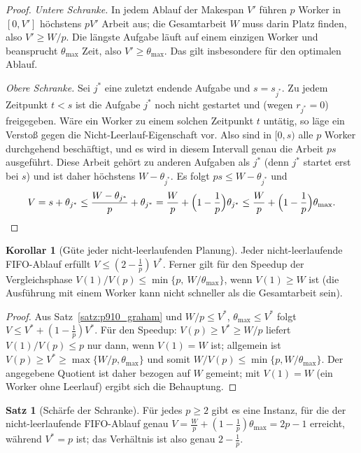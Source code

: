 \documentclass[a4paper,12pt, twoside]{report}
\theoremstyle{definition}
\newtheorem{satz}{Satz}
\newtheorem{korollar}{Korollar}
\begin{document}
\begin{proof}
\emph{Untere Schranke.} In jedem Ablauf der Makespan $V'$ führen $p$ Worker in $[0,V']$ höchstens $pV'$ Arbeit aus; die Gesamtarbeit $W$ muss darin Platz finden, also $V'\ge W/p$. Die längste Aufgabe läuft auf einem einzigen Worker und beansprucht $\theta_{\max}$ Zeit, also $V'\ge\theta_{\max}$. Das gilt insbesondere für den optimalen Ablauf.

\emph{Obere Schranke.} Sei $j^\ast$ eine zuletzt endende Aufgabe und $s=s_{j^\ast}$. Zu jedem Zeitpunkt $t<s$ ist die Aufgabe $j^\ast$ noch nicht gestartet und (wegen $r_{j^\ast}=0$) freigegeben. Wäre ein Worker zu einem solchen Zeitpunkt $t$ untätig, so läge ein Verstoß gegen die Nicht-Leerlauf-Eigenschaft vor. Also sind in $[0,s)$ alle $p$ Worker durchgehend beschäftigt, und es wird in diesem Intervall genau die Arbeit $ps$ ausgeführt. Diese Arbeit gehört zu anderen Aufgaben als $j^\ast$ (denn $j^\ast$ startet erst bei $s$) und ist daher höchstens $W-\theta_{j^\ast}$. Es folgt $ps\le W-\theta_{j^\ast}$ und
\[
V=s+\theta_{j^\ast}\le\frac{W-\theta_{j^\ast}}{p}+\theta_{j^\ast}=\frac Wp+\Bigl(1-\frac1p\Bigr)\theta_{j^\ast}\le\frac Wp+\Bigl(1-\frac1p\Bigr)\theta_{\max}.\qedhere
\]
\end{proof}

\begin{korollar}[Güte jeder nicht-leerlaufenden Planung]
\label{kor:p910_gute}
Jeder nicht-leerlaufende FIFO-Ablauf erfüllt $V\le(2-\tfrac1p)\,V^\ast$. Ferner gilt für den Speedup der Vergleichsphase $V(1)/V(p)\le\min\{p,\ W/\theta_{\max}\}$, wenn $V(1)\ge W$ ist (die Ausführung mit einem Worker kann nicht schneller als die Gesamtarbeit sein).
\end{korollar}

\begin{proof}
Aus Satz~\ref{satz:p910_graham} und $W/p\le V^\ast$, $\theta_{\max}\le V^\ast$ folgt $V\le V^\ast+(1-\frac1p)V^\ast$. Für den Speedup: $V(p)\ge V^\ast\ge W/p$ liefert $V(1)/V(p)\le p$ nur dann, wenn $V(1)=W$ ist; allgemein ist $V(p)\ge V^\ast\ge\max\{W/p,\theta_{\max}\}$ und somit $W/V(p)\le\min\{p,W/\theta_{\max}\}$. Der angegebene Quotient ist daher bezogen auf $W$ gemeint; mit $V(1)=W$ (ein Worker ohne Leerlauf) ergibt sich die Behauptung.
\end{proof}

\begin{satz}[Schärfe der Schranke]
\label{satz:p910_scharf}
Für jedes $p\ge 2$ gibt es eine Instanz, für die der nicht-leerlaufende FIFO-Ablauf genau $V=\frac Wp+(1-\frac1p)\theta_{\max}=2p-1$ erreicht, während $V^\ast=p$ ist; das Verhältnis ist also genau $2-\frac1p$.
\end{satz}
\end{document}
